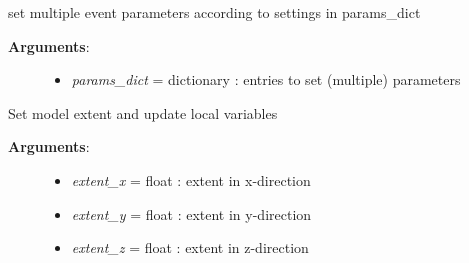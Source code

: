 \documentclass[a4paper,10pt,english]{sphinxmanual}
\begin{document}
\begin{fulllineitems}
\begin{fulllineitems}
\begin{description}
\begin{itemize}
\end{itemize}

\end{description}

\end{fulllineitems}


\begin{fulllineitems}
\label{pynoddy:pynoddy.history.NoddyHistory.set_event_params}
set multiple event parameters according to settings in params\_dict
\begin{description}
\item[{\textbf{Arguments}:}] \leavevmode\begin{itemize}
\item {} 
\emph{params\_dict} = dictionary : entries to set (multiple) parameters

\end{itemize}

\end{description}

\end{fulllineitems}


\begin{fulllineitems}
\label{pynoddy:pynoddy.history.NoddyHistory.set_extent}
Set model extent and update local variables
\begin{description}
\item[{\textbf{Arguments}:}] \leavevmode\begin{itemize}
\item {} 
\emph{extent\_x} = float : extent in x-direction

\item {} 
\emph{extent\_y} = float : extent in y-direction

\item {} 
\emph{extent\_z} = float : extent in z-direction

\end{itemize}

\end{description}

\end{fulllineitems}


\end{fulllineitems}
\end{document}
